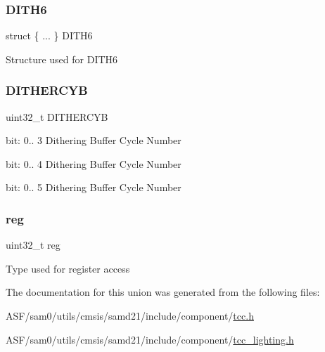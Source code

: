 \subsubsection{\texorpdfstring{DITH6}{DITH6}\hspace{0.1cm}{\footnotesize\ttfamily [2/2]}}
{\footnotesize\ttfamily struct \{ ... \}   D\+I\+T\+H6}

Structure used for D\+I\+T\+H6 \mbox{\label{union_t_c_c___c_c_b___type_a156fbeb3ca1ed9f6622afd99724ad24c}} 
\subsubsection{\texorpdfstring{DITHERCYB}{DITHERCYB}}
{\footnotesize\ttfamily uint32\+\_\+t D\+I\+T\+H\+E\+R\+C\+YB}

bit\+: 0.. 3 Dithering Buffer Cycle Number

bit\+: 0.. 4 Dithering Buffer Cycle Number

bit\+: 0.. 5 Dithering Buffer Cycle Number \mbox{\label{union_t_c_c___c_c_b___type_a6b91636401516a477989a336376d7b40}} 
\subsubsection{\texorpdfstring{reg}{reg}}
{\footnotesize\ttfamily uint32\+\_\+t reg}

Type used for register access 

The documentation for this union was generated from the following files\+:\begin{DoxyCompactItemize}
\item 
A\+S\+F/sam0/utils/cmsis/samd21/include/component/\mbox{\hyperlink{tcc_8h}{tcc.\+h}}\item 
A\+S\+F/sam0/utils/cmsis/samd21/include/component/\mbox{\hyperlink{tcc__lighting_8h}{tcc\+\_\+lighting.\+h}}\end{DoxyCompactItemize}
